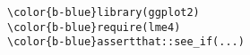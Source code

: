 \documentclass[class=minimal,border=0]{standalone}
\begin{document}
%
\begin{BVerbatim}[bgcolor=b-darkgrey]
\color{b-blue}library(ggplot2)
\color{b-blue}require(lme4)
\color{b-blue}assertthat::see_if(...)
\end{BVerbatim}
\end{document}
